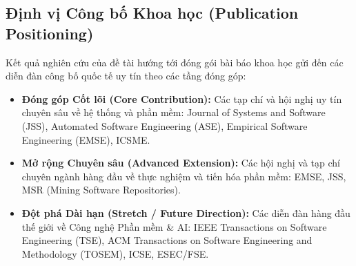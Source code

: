 \subsection{Định vị Công bố Khoa học (Publication Positioning)}
Kết quả nghiên cứu của đề tài hướng tới đóng gói bài báo khoa học gửi đến các diễn đàn công bố quốc tế uy tín theo các tầng đóng góp:
\begin{itemize}
  \item \textbf{Đóng góp Cốt lõi (Core Contribution):} Các tạp chí và hội nghị uy tín chuyên sâu về hệ thống và phần mềm: Journal of Systems and Software (JSS), Automated Software Engineering (ASE), Empirical Software Engineering (EMSE), ICSME.
  \item \textbf{Mở rộng Chuyên sâu (Advanced Extension):} Các hội nghị và tạp chí chuyên ngành hàng đầu về thực nghiệm và tiến hóa phần mềm: EMSE, JSS, MSR (Mining Software Repositories).
  \item \textbf{Đột phá Dài hạn (Stretch / Future Direction):} Các diễn đàn hàng đầu thế giới về Công nghệ Phần mềm \& AI: IEEE Transactions on Software Engineering (TSE), ACM Transactions on Software Engineering and Methodology (TOSEM), ICSE, ESEC/FSE.
\end{itemize}
